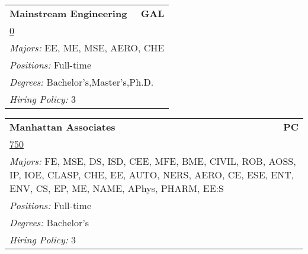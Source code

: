 \documentclass[twoside]{article}
\begin{document}
\begin{center}
\begin{multicols}{3}
\begin{FlushLeft}
\begin{minipage}{.9\columnwidth}
\end{minipage}
 
\begin{minipage}{.9\columnwidth}\begin{tabularx}{.95\columnwidth}{Xr}
                 {\Large\bf Mainstream Engineering} & {\Large\bf GAL}\\
    \multicolumn{2}{p{.95\columnwidth}}{\url{0}}\\
    \multicolumn{2}{p{.95\columnwidth}}{\emph{Majors:} EE, ME, MSE, AERO, CHE}\\
    \multicolumn{2}{p{.95\columnwidth}}{\emph{Positions:} Full-time}\\
    \multicolumn{2}{p{.95\columnwidth}}{\emph{Degrees:} Bachelor's,Master's,Ph.D.}\\
    \multicolumn{2}{p{.95\columnwidth}}{\emph{Hiring Policy:} 3}\\
    \end{tabularx}
    
\end{minipage}
 
\begin{minipage}{.9\columnwidth}\begin{tabularx}{.95\columnwidth}{Xr}
                 {\Large\bf Manhattan Associates} & {\Large\bf PC}\\
    \multicolumn{2}{p{.95\columnwidth}}{\url{750}}\\
    \multicolumn{2}{p{.95\columnwidth}}{\emph{Majors:} FE, MSE, DS, ISD, CEE, MFE, BME, CIVIL, ROB, AOSS, IP, IOE, CLASP, CHE, EE, AUTO, NERS, AERO, CE, ESE, ENT, ENV, CS, EP, ME, NAME, APhys, PHARM, EE:S}\\
    \multicolumn{2}{p{.95\columnwidth}}{\emph{Positions:} Full-time}\\
    \multicolumn{2}{p{.95\columnwidth}}{\emph{Degrees:} Bachelor's}\\
    \multicolumn{2}{p{.95\columnwidth}}{\emph{Hiring Policy:} 3}\\
    \end{tabularx}
    
\end{minipage}
 

\end{FlushLeft}
\end{multicols}
\end{center}
\end{document}
